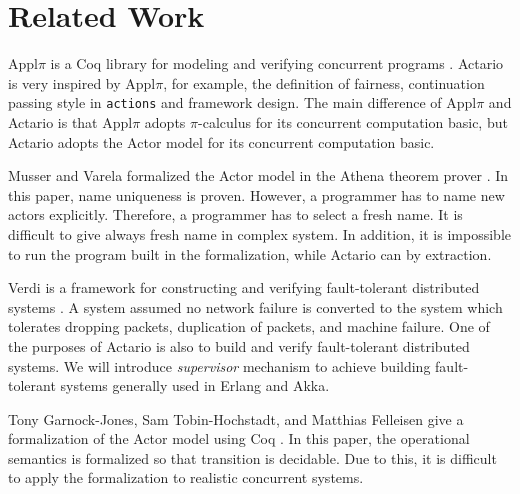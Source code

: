 \section{Related Work}
\label{sec:relatedwork}

Appl\(\pi\) is a Coq library for modeling and verifying concurrent programs \cite{Affeldt200817}.
Actario is very inspired by Appl\(\pi\), for example, the definition of fairness, continuation passing style in \texttt{actions} and framework design.
The main difference of Appl\(\pi\) and Actario is that Appl\(\pi\) adopts \(\pi\)-calculus for its concurrent computation basic, but Actario adopts the Actor model for its concurrent computation basic.

Musser and Varela formalized the Actor model in the Athena theorem prover \cite{Athena}\cite{Musser:2013aa}. %
In this paper, name uniqueness is proven.
However, a programmer has to name new actors explicitly.
Therefore, a programmer has to select a fresh name. It is difficult to give always fresh name in complex system.
In addition, it is impossible to run the program built in the formalization, while Actario can by extraction.

Verdi is a framework for constructing and verifying fault-tolerant distributed systems \cite{Verdi}.
A system assumed no network failure is converted to the system which tolerates dropping packets, duplication of packets, and machine failure.
One of the purposes of Actario is also to build and verify fault-tolerant distributed systems.
We will introduce \textit{supervisor} mechanism to achieve building fault-tolerant systems generally used in Erlang and Akka.


Tony Garnock-Jones, Sam Tobin-Hochstadt, and Matthias Felleisen give a formalization of the Actor model using Coq \cite{Garnock-Jones:2014aa}.
In this paper, the operational semantics is formalized so that transition is decidable.
Due to this, it is difficult to apply the formalization to realistic concurrent systems.
